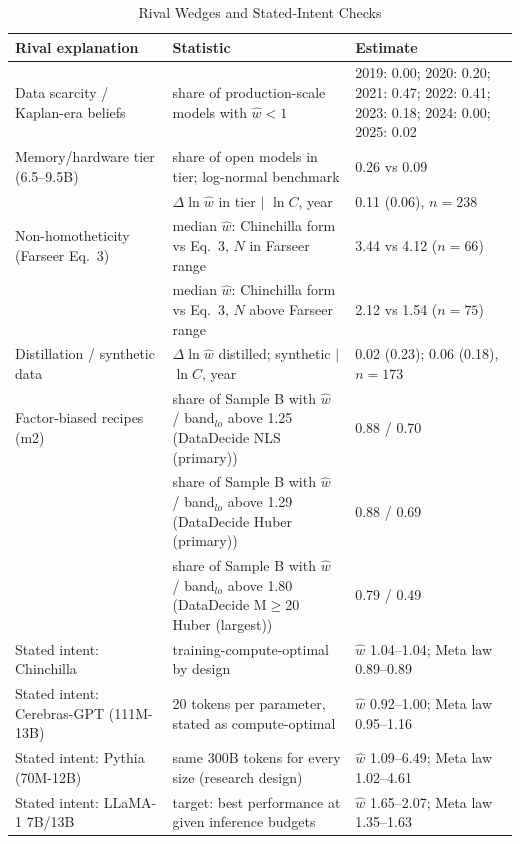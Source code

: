 \begin{table}[htbp]
\centering
\scriptsize
\begin{threeparttable}
\caption{Rival Wedges and Stated-Intent Checks}
\label{tab:m3_rivals}
\begin{tabular}{@{}p{3.6cm}p{6.2cm}p{4.6cm}@{}}
\toprule
Rival explanation & Statistic & Estimate \\
\midrule
Data scarcity / Kaplan-era beliefs & share of production-scale models with $\hat w<1$ & 2019: 0.00; 2020: 0.20; 2021: 0.47; 2022: 0.41; 2023: 0.18; 2024: 0.00; 2025: 0.02 \\
Memory/hardware tier (6.5--9.5B) & share of open models in tier; log-normal benchmark & 0.26 vs 0.09 \\
 & $\Delta\ln\hat w$ in tier $|$ $\ln C$, year & 0.11 (0.06), $n=238$ \\
Non-homotheticity (Farseer Eq.~3) & median $\hat w$: Chinchilla form vs Eq.~3, $N$ in Farseer range & 3.44 vs 4.12 ($n=66$) \\
 & median $\hat w$: Chinchilla form vs Eq.~3, $N$ above Farseer range & 2.12 vs 1.54 ($n=75$) \\
Distillation / synthetic data & $\Delta\ln\hat w$ distilled; synthetic $|$ $\ln C$, year & 0.02 (0.23); 0.06 (0.18), $n=173$ \\
Factor-biased recipes (m2) & share of Sample B with $\hat w$ / band$_{lo}$ above 1.25 (DataDecide NLS (primary)) & 0.88 / 0.70 \\
 & share of Sample B with $\hat w$ / band$_{lo}$ above 1.29 (DataDecide Huber (primary)) & 0.88 / 0.69 \\
 & share of Sample B with $\hat w$ / band$_{lo}$ above 1.80 (DataDecide M$\ge$20 Huber (largest)) & 0.79 / 0.49 \\
\midrule
Stated intent: Chinchilla & training-compute-optimal by design \citep{hoffmann2022training} & $\hat w$ 1.04--1.04; Meta law 0.89--0.89 \\
Stated intent: Cerebras-GPT (111M-13B) & 20 tokens per parameter, stated as compute-optimal \citep{dey2023cerebras} & $\hat w$ 0.92--1.00; Meta law 0.95--1.16 \\
Stated intent: Pythia (70M-12B) & same 300B tokens for every size (research design) \citep{biderman2023pythia} & $\hat w$ 1.09--6.49; Meta law 1.02--4.61 \\
Stated intent: LLaMA-1 7B/13B & target: best performance at given inference budgets \citep{touvron2023llama} & $\hat w$ 1.65--2.07; Meta law 1.35--1.63 \\

\end{tabular}
\end{threeparttable}
\end{table}
